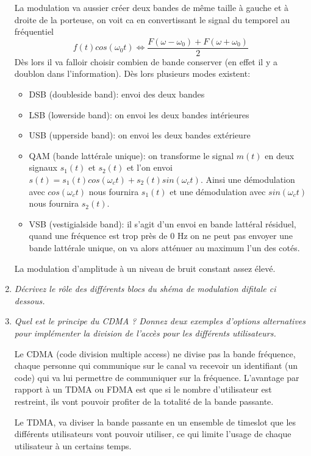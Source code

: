 \documentclass[a4paper, 11pt]{article}
\begin{document}
\begin{enumerate}
La modulation va aussier créer deux bandes de même taille à gauche et à droite de la porteuse, on voit ca en convertissant le signal du temporel au fréquentiel
$$f(t) cos(\omega_0 t) \Leftrightarrow \frac{F(\omega - \omega_0) + F(\omega + \omega_0)}{2}$$
Dès lors il va falloir choisir combien de bande conserver (en effet il y a doublon dans l'information). Dès lors plusieurs modes existent:
\begin{itemize}
\item DSB (doubleside band): envoi des deux bandes
\item LSB (lowerside band): on envoi les deux bandes intérieures
\item USB (upperside band): on envoi les deux bandes extérieure
\item QAM (bande lattérale unique): on transforme le signal $m(t)$ en deux signaux $s_1(t)$ et $s_2(t)$ et l'on envoi $s(t) = s_1(t) cos(\omega_c t) + s_2(t) sin(\omega_c t)$. Ainsi une démodulation avec $cos(\omega_c t)$ nous fournira $s_1(t)$ et une démodulation avec $sin(\omega_c t)$ nous fournira $s_2(t)$. 
\item VSB (vestigialside band): il s'agit d'un envoi en bande lattéral résiduel, quand une fréquence est trop près de 0 Hz on ne peut pas envoyer une bande lattérale unique, on va alors atténuer au maximum l'un des cotés.
\end{itemize}

La modulation d'amplitude à un niveau de bruit constant assez élevé. 

\item \textit{Décrivez le rôle des différents blocs du shéma de modulation difitale ci dessous.}


\item \textit{Quel est le principe du CDMA ? Donnez deux exemples d'options alternatives pour implémenter la division de l'accès pour les différents utilisateurs.}

Le CDMA (code division multiple access) ne divise pas la bande fréquence, chaque personne qui communique sur le canal va recevoir un identifiant (un code) qui va lui permettre de communiquer sur la fréquence. L'avantage par rapport à un TDMA ou FDMA est que si le nombre d'utilisateur est restreint, ils vont pouvoir profiter de la totalité de la bande passante.

Le TDMA, va diviser la bande passante en un ensemble de timeslot que les différents utilisateurs vont pouvoir utiliser, ce qui limite l'usage de chaque utilisateur à un certains temps.


\end{enumerate}
\end{document}
